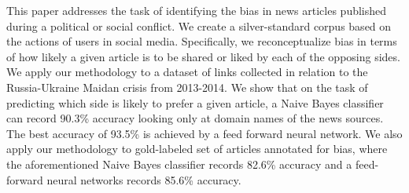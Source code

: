 This paper addresses the task of identifying the bias in news articles published during a political or social conflict. We create a silver-standard corpus based on the actions of users in social media. Specifically, we reconceptualize bias in terms of how likely a given article is to be shared or liked by each of the opposing sides. We apply our methodology to a dataset of links collected in relation to the Russia-Ukraine Maidan crisis from 2013-2014. We show that on the task of predicting which side is likely to prefer a given article, a Naive Bayes classifier can record 90.3\% accuracy looking only at domain names of the news sources. The best accuracy of 93.5\% is achieved by a feed forward neural network. We also apply our methodology to gold-labeled set of articles annotated for bias, where the aforementioned Naive Bayes classifier records 82.6\% accuracy and a feed-forward neural networks records 85.6\% accuracy.
